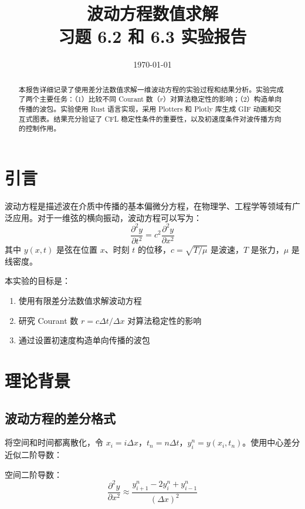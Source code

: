 \documentclass[12pt,a4paper]{article}
\title{\textbf{波动方程数值求解\\习题 6.2 和 6.3 实验报告}}
\author{}
\date{\today}
\begin{document}
\maketitle

\begin{abstract}
本报告详细记录了使用差分法数值求解一维波动方程的实验过程和结果分析。实验完成了两个主要任务：（1）比较不同 Courant 数（$r$）对算法稳定性的影响；（2）构造单向传播的波包。实验使用 Rust 语言实现，采用 Plotters 和 Plotly 库生成 GIF 动画和交互式图表。结果充分验证了 CFL 稳定性条件的重要性，以及初速度条件对波传播方向的控制作用。
\end{abstract}

\tableofcontents
\newpage

\section{引言}

波动方程是描述波在介质中传播的基本偏微分方程，在物理学、工程学等领域有广泛应用。对于一维弦的横向振动，波动方程可以写为：
\begin{equation}
\frac{\partial^2 y}{\partial t^2} = c^2 \frac{\partial^2 y}{\partial x^2}
\end{equation}
其中 $y(x,t)$ 是弦在位置 $x$、时刻 $t$ 的位移，$c = \sqrt{T/\mu}$ 是波速，$T$ 是张力，$\mu$ 是线密度。

本实验的目标是：
\begin{enumerate}
    \item 使用有限差分法数值求解波动方程
    \item 研究 Courant 数 $r = c\Delta t / \Delta x$ 对算法稳定性的影响
    \item 通过设置初速度构造单向传播的波包
\end{enumerate}

\section{理论背景}

\subsection{波动方程的差分格式}

将空间和时间都离散化，令 $x_i = i\Delta x$，$t_n = n\Delta t$，$y_i^n = y(x_i, t_n)$。使用中心差分近似二阶导数：

空间二阶导数：
\begin{equation}
\frac{\partial^2 y}{\partial x^2} \approx \frac{y_{i+1}^n - 2y_i^n + y_{i-1}^n}{(\Delta x)^2}
\end{equation}
\end{document}
